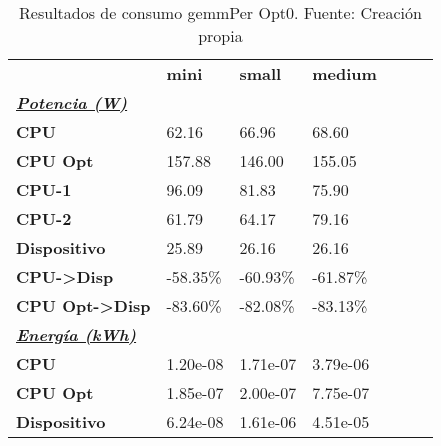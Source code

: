 \begin{table}[H]
    \centering
    \begin{tabular}{lllllll}
    \rowcolor[HTML]{DAE8FC} \ & \textbf{mini} & \textbf{	small} & \textbf{	medium} \\
    \cellcolor[HTML]{DAE8FC} \textbf{\textbf{{\emph{{\underline{{Potencia (W)}}}}}}} &  & 	 & 	 \\
    \rowcolor[HTML]{EFEFEF} \cellcolor[HTML]{DAE8FC} \textbf{CPU} & 62.16 & 	66.96 & 	68.60 \\
    \cellcolor[HTML]{DAE8FC} \textbf{CPU Opt} & 157.88 & 	146.00 & 	155.05 \\
    \rowcolor[HTML]{EFEFEF} \cellcolor[HTML]{DAE8FC} \textbf{\quad CPU-1} & 96.09 & 	81.83 & 	75.90 \\
    \cellcolor[HTML]{DAE8FC} \textbf{\quad CPU-2} & 61.79 & 	64.17 & 	79.16 \\
    \rowcolor[HTML]{EFEFEF} \cellcolor[HTML]{DAE8FC} \textbf{Dispositivo} & 25.89 & 	26.16 & 	26.16 \\
    \cellcolor[HTML]{DAE8FC} \textbf{CPU->Disp} & -58.35\% & 	-60.93\% & 	-61.87\% \\
    \rowcolor[HTML]{EFEFEF} \cellcolor[HTML]{DAE8FC} \textbf{CPU Opt->Disp} & -83.60\% & 	-82.08\% & 	-83.13\% \\
    \cellcolor[HTML]{DAE8FC} \textbf{\textbf{{\emph{{\underline{{Energía (kWh)}}}}}}} &  & 	 & 	 \\
    \rowcolor[HTML]{EFEFEF} \cellcolor[HTML]{DAE8FC} \textbf{CPU} & 1.20e-08 & 	1.71e-07 & 	3.79e-06 \\
    \cellcolor[HTML]{DAE8FC} \textbf{CPU Opt} & 1.85e-07 & 	2.00e-07 & 	7.75e-07 \\
    \rowcolor[HTML]{EFEFEF} \cellcolor[HTML]{DAE8FC} \textbf{Dispositivo} & 6.24e-08 & 	1.61e-06 & 	4.51e-05 \\
    \end{tabular}
    \caption[Resultados de consumo gemmPer Opt0]{{Resultados de consumo gemmPer Opt0. Fuente: Creación propia}}
    \label{table_test_gemmPer_Opt0_hw_powerResults}
\end{table}
